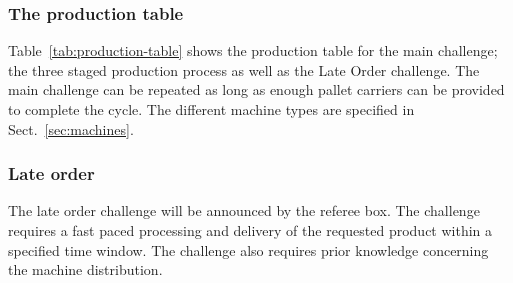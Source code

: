 \documentclass[12pt,twoside]{article}
\begin{document}





\subsubsection{The production table}

Table~\ref{tab:production-table} shows the production table for the
main challenge; the three staged production process as well as the
Late Order challenge. The main challenge can be repeated as long as
enough pallet carriers can be provided to complete the cycle. The
different machine types are specified in Sect.~\ref{sec:machines}.



\subsubsection{Late order}

The late order challenge will be announced by the referee box. The
challenge requires a fast paced processing and delivery of the
requested product within a specified time window. The challenge also
requires prior knowledge concerning the machine distribution.
\end{document}
